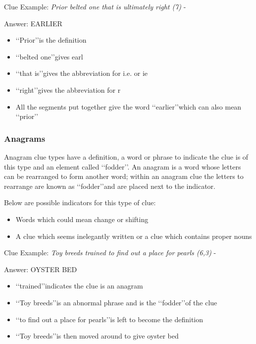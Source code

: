 Clue Example: \emph{Prior belted one that is ultimately right (7)} - \citep{shuchiCharades08}

Answer: EARLIER 

\begin{itemize}
	\item \lq\lq Prior\rq\rq is the definition 
	\item \lq\lq belted one\rq\rq gives earl 
	\item \lq\lq that is\rq\rq gives the abbreviation for i.e. or ie 
	\item \lq\lq right\rq\rq gives the abbreviation for r 
	\item All the segments put together give the word \lq\lq earlier\rq\rq which can also mean \lq\lq prior\rq\rq
\end{itemize}

\subsubsection{Anagrams}

Anagram clue types have a definition, a word or phrase to indicate the clue is of this type and an element called \lq\lq fodder\rq\rq. An anagram is a word whose letters can be rearranged to form another word; within an anagram clue the letters to rearrange are known as \lq\lq fodder\rq\rq and are placed next to the indicator.  

Below are possible indicators for this type of clue:
\begin{itemize} 
	\item Words which could mean change or shifting 
	\item A clue which seems inelegantly written or a clue which contains proper nouns
\\
\end{itemize}

Clue Example: \emph{Toy breeds trained to find out a place for pearls (6,3)} - \citep{shuchiAnagram08} 

Answer: OYSTER BED 

\begin{itemize}
	\item \lq\lq trained\rq\rq indicates the clue is an anagram   
	\item \lq\lq Toy breeds\rq\rq is an abnormal phrase and is the \lq\lq fodder\rq\rq of the clue 
	\item \lq\lq to find out a place for pearls\rq\rq is left to become the definition 
	\item \lq\lq Toy breeds\rq\rq is then moved around to give oyster bed 
\end{itemize}

